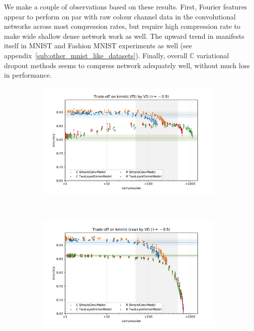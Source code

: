 \documentclass[a4paper,10pt]{article}
\newcommand{\cplx}{\mathbb{C}}
\begin{document}
We make a couple of observations based on these results. First, Fourier features appear to
perform on par with raw colour channel data in the convolutional networks across most
compression rates, but require high compression rate to make wide shallow dense network work
as well. The upward trend in manifests itself in MNIST and Fashion MNIST experiments as well
(see appendix~\ref{sub:other_mnist_like_datasets}). Finally, overall $\cplx$ variational
dropout methods seems to compress network adequately well, without much loss in performance.

\begin{figure}[!h]
  \centering
  \begin{subfigure}[b]{1.\textwidth}  %
    \centering
    \includegraphics[width=\linewidth]{../assets/figure__mnist-like__trade-off/legacy__VD__kmnist__fft__-0.5.pdf}
  \end{subfigure} \\%
  \begin{subfigure}[b]{1.\textwidth}  %
    \centering
    \includegraphics[width=\linewidth]{../assets/figure__mnist-like__trade-off/legacy__VD__kmnist__raw__-0.5.pdf}

\end{subfigure}
\end{figure}
\end{document}
